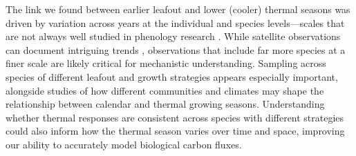\documentclass{article}[12pt]
\begin{document}

The link we found between earlier leafout and lower (cooler) thermal seasons was driven by variation across years at the individual and species levels---scales that are not always well studied in phenology research  \citep{Menzel1999}. While satellite observations can document intriguing trends \citep[e.g.,][]{Zohner2023}, observations that include far more species at a finer scale are likely critical for mechanistic understanding.  Sampling across species of different leafout and growth strategies appears especially important, alongside studies of how different communities and climates may shape the relationship between calendar and thermal growing seasons. 
Understanding whether thermal responses are consistent across species with different strategies could also inform how the thermal season varies over time and space, improving our ability to accurately model biological carbon fluxes.
\end{document}

